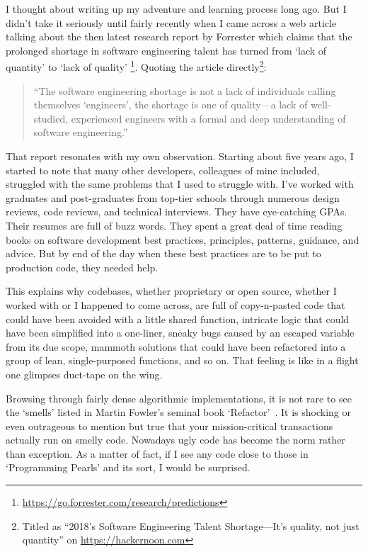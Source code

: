 \documentclass[oneside,11pt]{book}
\theoremstyle{definition}
\theoremstyle{remark}
\begin{document}
I thought about writing up my adventure and learning process long ago.
But I didn't take it seriously until fairly recently when
I came across a web article talking about the then latest research report by Forrester
which claims that the prolonged shortage in software engineering talent has turned from
`lack of quantity' to `lack of quality'
\footnote{\url{https://go.forrester.com/research/predictions}}.
Quoting the article directly\footnote{Titled as ``2018's Software Engineering Talent
Shortage---It's quality, not just quantity'' on \url{https://hackernoon.com}}:
\begin{quote}
    ``The software engineering shortage is not a lack of individuals calling
    themselves `engineers', the shortage is one of quality---a lack of well-studied,
    experienced engineers with a formal and deep understanding of software engineering.''
\end{quote}


That report resonates with my own observation.
Starting about five years ago,
I started to note that many other developers, colleagues of mine included,
struggled with the same problems that I used to struggle with.
I've worked with graduates and post-graduates from top-tier schools
through numerous design reviews, code reviews, and technical interviews.
They have eye-catching GPAs.
Their resumes are full of buzz words.
They spent a great deal of time reading books on software development best practices, principles,
patterns, guidance, and advice.
But by end of the day when these best practices are to be put to production code, they
needed help.


This explains why codebases, whether proprietary or open source, whether I worked with or I
happened to come across,
are full of copy-n-pasted code that could have been avoided with a little shared function,
intricate logic that could have been simplified into a one-liner,
sneaky bugs caused by an escaped variable from its due scope,
mammoth solutions that could have been refactored into a group of lean, single-purposed functions,
and so on.
That feeling is like in a flight one glimpses duct-tape on the wing.


Browsing through fairly dense algorithmic implementations, it is not rare to see
the `smells' listed in Martin Fowler's seminal book `Refactor'~\cite{Fowler1999}.
It is shocking or even outrageous to mention but true that your mission-critical transactions
actually run on smelly code.
Nowadays ugly code has become the norm rather than exception.
As a matter of fact, if I see any code close to those in `Programming
Pearls' and its sort\cite{Bentley:1986:PP}, I would be surprised.
\end{document}

